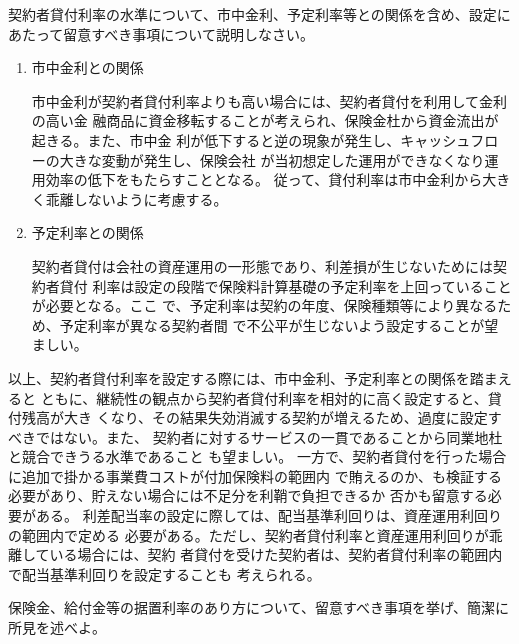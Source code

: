 \documentclass[report,gutter=10mm,fore-edge=10mm,uplatex,dvipdfmx]{jlreq}
\begin{document}

契約者貸付利率の水準について、市中金利、予定利率等との関係を含め、設定にあたって留意すべき事項について説明しなさい。



\begin{enumerate}
\tightlist
\item
  市中金利との関係

  市中金利が契約者貸付利率よりも高い場合には、契約者貸付を利用して金利の高い金
融商品に資金移転することが考えられ、保険金杜から資金流出が起きる。また、市中金
利が低下すると逆の現象が発生し、キャッシュフローの大きな変動が発生し、保険会社
が当初想定した運用ができなくなり運用効率の低下をもたらすこととなる。
従って、貸付利率は市中金利から大きく乖離しないように考慮する。

\item
  予定利率との関係

契約者貸付は会社の資産運用の一形態であり、利差損が生じないためには契約者貸付
利率は設定の段階で保険料計算基礎の予定利率を上回っていることが必要となる。ここ
で、予定利率は契約の年度、保険種類等により異なるため、予定利率が異なる契約者間
で不公平が生じないよう設定することが望ましい。

\end{enumerate}

以上、契約者貸付利率を設定する際には、市中金利、予定利率との関係を踏まえると
ともに、継続性の観点から契約者貸付利率を相対的に高く設定すると、貸付残高が大き
くなり、その結果失効消滅する契約が増えるため、過度に設定すべきではない。また、
契約者に対するサービスの一貫であることから同業地杜と競合できうる水準であること
も望ましい。
一方で、契約者貸付を行った場合に追加で掛かる事業費コストが付加保険料の範囲内
で賄えるのか、も検証する必要があり、貯えない場合には不足分を利鞘で負担できるか
否かも留意する必要がある。
利差配当率の設定に際しては、配当基準利回りは、資産運用利回りの範囲内で定める
必要がある。ただし、契約者貸付利率と資産運用利回りが乖離している場合には、契約
者貸付を受けた契約者は、契約者貸付利率の範囲内で配当基準利回りを設定することも
考えられる。

保険金、給付金等の据置利率のあり方について、留意すべき事項を挙げ、簡潔に所見を述べよ。

\end{document}
